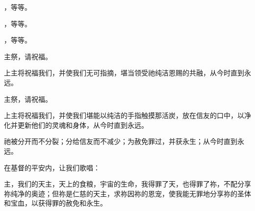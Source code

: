 \par

，等等。\par

\par

，等等。\par

\par

，等等。\par

\par

主祭，请祝福。\par

\par

上主将祝福我们，并使我们无可指摘，堪当领受祂纯洁恩赐的共融，从今时直到永远。\par

\par

主祭，请祝福。\par

\par

上主将祝福我们，并使我们堪能以纯洁的手指触摸那活炭，放在信友的口中，以净化并更新他们的灵魂和身体，从今时直到永远。\par

\par

祂被分开而不分裂；分给信友而不减少；为赦免罪过，并获永生；从今时直到永远。\par

\par

在基督的平安内，让我们歌唱：\par

\par

\par

\par

主，我们的天主，天上的食粮，宇宙的生命，我得罪了天，也得罪了祢，不配分享祢纯净的奥迹；但祢是仁慈的天主，求祢因祢的恩宠，使我能无罪地分享祢的圣体和宝血，以获得罪的赦免和永生。\par

